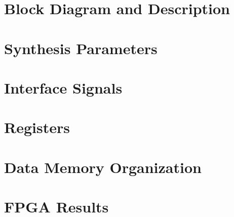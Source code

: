 \documentclass{../../submodules/TEX/document/ug/ug}
\begin{document}
\section{\textcolor[rgb]{0,0,0}{Block Diagram and Description}}

\clearpage

\section{\textcolor[rgb]{0,0,0}{Synthesis Parameters}}


\section{Interface Signals}

 
\section{Registers}


\section{Data Memory Organization}


\section{\textcolor[rgb]{0,0,0}{FPGA Results}}



%
%
\end{document}
